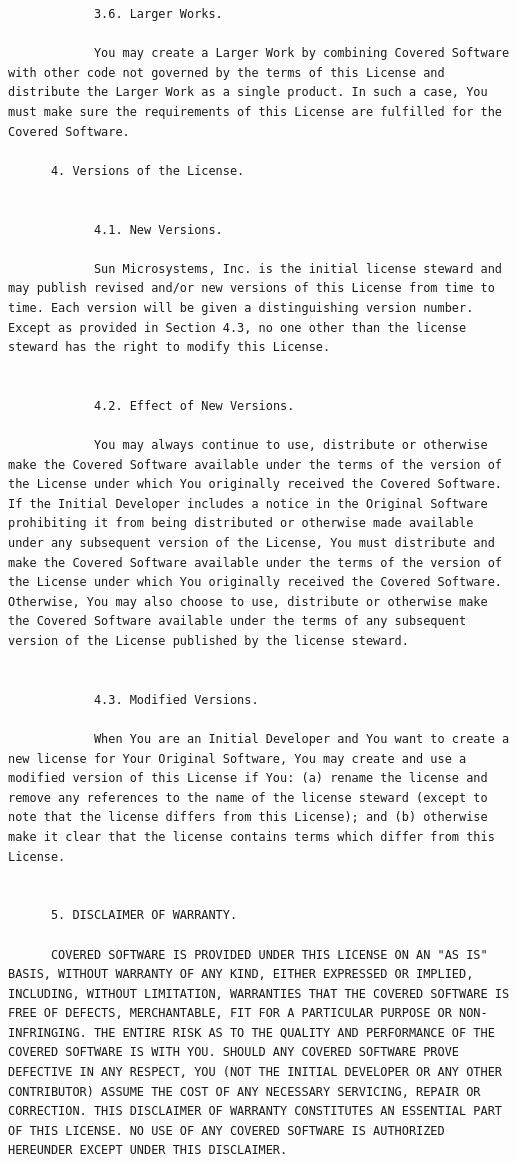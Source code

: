\documentclass[10pt, headsepline,DIV14,BCOR0.5cm]{scrreprt}
\begin{document}
\begin{lstlisting}
            3.6. Larger Works.

            You may create a Larger Work by combining Covered Software with other code not governed by the terms of this License and distribute the Larger Work as a single product. In such a case, You must make sure the requirements of this License are fulfilled for the Covered Software.

      4. Versions of the License.
            

            4.1. New Versions.

            Sun Microsystems, Inc. is the initial license steward and may publish revised and/or new versions of this License from time to time. Each version will be given a distinguishing version number. Except as provided in Section 4.3, no one other than the license steward has the right to modify this License.
            

            4.2. Effect of New Versions.

            You may always continue to use, distribute or otherwise make the Covered Software available under the terms of the version of the License under which You originally received the Covered Software. If the Initial Developer includes a notice in the Original Software prohibiting it from being distributed or otherwise made available under any subsequent version of the License, You must distribute and make the Covered Software available under the terms of the version of the License under which You originally received the Covered Software. Otherwise, You may also choose to use, distribute or otherwise make the Covered Software available under the terms of any subsequent version of the License published by the license steward.
            

            4.3. Modified Versions.

            When You are an Initial Developer and You want to create a new license for Your Original Software, You may create and use a modified version of this License if You: (a) rename the license and remove any references to the name of the license steward (except to note that the license differs from this License); and (b) otherwise make it clear that the license contains terms which differ from this License.
    

      5. DISCLAIMER OF WARRANTY.

      COVERED SOFTWARE IS PROVIDED UNDER THIS LICENSE ON AN "AS IS" BASIS, WITHOUT WARRANTY OF ANY KIND, EITHER EXPRESSED OR IMPLIED, INCLUDING, WITHOUT LIMITATION, WARRANTIES THAT THE COVERED SOFTWARE IS FREE OF DEFECTS, MERCHANTABLE, FIT FOR A PARTICULAR PURPOSE OR NON-INFRINGING. THE ENTIRE RISK AS TO THE QUALITY AND PERFORMANCE OF THE COVERED SOFTWARE IS WITH YOU. SHOULD ANY COVERED SOFTWARE PROVE DEFECTIVE IN ANY RESPECT, YOU (NOT THE INITIAL DEVELOPER OR ANY OTHER CONTRIBUTOR) ASSUME THE COST OF ANY NECESSARY SERVICING, REPAIR OR CORRECTION. THIS DISCLAIMER OF WARRANTY CONSTITUTES AN ESSENTIAL PART OF THIS LICENSE. NO USE OF ANY COVERED SOFTWARE IS AUTHORIZED HEREUNDER EXCEPT UNDER THIS DISCLAIMER.
    


\end{lstlisting}
\end{document}

